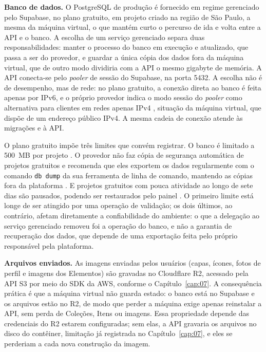 \textbf{Banco de dados.} O PostgreSQL de produção é fornecido em regime gerenciado pelo Supabase, no plano gratuito, em projeto criado na região de São Paulo, a mesma da máquina virtual, o que mantém curto o percurso de ida e volta entre a API e o banco. A escolha de um serviço gerenciado separa duas responsabilidades: manter o processo do banco em execução e atualizado, que passa a ser do provedor, e guardar a única cópia dos dados fora da máquina virtual, que de outro modo dividiria com a API o mesmo gigabyte de memória. A API conecta-se pelo \textit{pooler} de sessão do Supabase, na porta 5432. A escolha não é de desempenho, mas de rede: no plano gratuito, a conexão direta ao banco é feita apenas por IPv6, e o próprio provedor indica o modo sessão do \textit{pooler} como alternativa para clientes em redes apenas IPv4 \cite{supabase2026connect}, situação da máquina virtual, que dispõe de um endereço público IPv4. A mesma cadeia de conexão atende às migrações e à API.

O plano gratuito impõe três limites que convém registrar. O banco é limitado a 500~MB por projeto \cite{supabase2026billing}. O provedor não faz cópia de segurança automática de projetos gratuitos e recomenda que eles exportem os dados regularmente com o comando \texttt{db dump} da sua ferramenta de linha de comando, mantendo as cópias fora da plataforma \cite{supabase2026backups}. E projetos gratuitos com pouca atividade ao longo de sete dias são pausados, podendo ser restaurados pelo painel \cite{supabase2026pausing}. O primeiro limite está longe de ser atingido por uma operação de validação; os dois últimos, ao contrário, afetam diretamente a confiabilidade do ambiente: o que a delegação ao serviço gerenciado removeu foi a operação do banco, e não a garantia de recuperação dos dados, que depende de uma exportação feita pelo próprio responsável pela plataforma.

\textbf{Arquivos enviados.} As imagens enviadas pelos usuários (capas, ícones, fotos de perfil e imagens dos Elementos) são gravadas no Cloudflare R2, acessado pela API S3 por meio do SDK da AWS, conforme o Capítulo~\ref{cap:07}. A consequência prática é que a máquina virtual não guarda estado: o banco está no Supabase e os arquivos estão no R2, de modo que perder a máquina exige apenas reinstalar a API, sem perda de Coleções, Itens ou imagens. Essa propriedade depende das credenciais do R2 estarem configuradas; sem elas, a API gravaria os arquivos no disco do contêiner, limitação já registrada no Capítulo~\ref{cap:07}, e eles se perderiam a cada nova construção da imagem.


